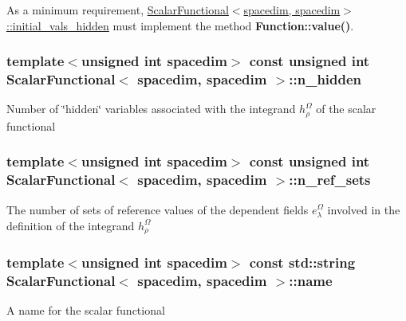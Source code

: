 As a minimum requirement, \hyperlink{class_scalar_functional_3_01spacedim_00_01spacedim_01_4_ae3282d5182360e0030e4cc5e02fbe2eb}{Scalar\+Functional$<$spacedim, spacedim$>$\+::initial\+\_\+vals\+\_\+hidden} must implement the method {\bf Function\+::value()}. 
\subsubsection[{\texorpdfstring{n\+\_\+hidden}{n_hidden}}]{\setlength{\rightskip}{0pt plus 5cm}template$<$unsigned int spacedim$>$ const unsigned int {\bf Scalar\+Functional}$<$ spacedim, spacedim $>$\+::n\+\_\+hidden}\hypertarget{class_scalar_functional_3_01spacedim_00_01spacedim_01_4_a7df6711471715f907bc9911449c5c825}{}\label{class_scalar_functional_3_01spacedim_00_01spacedim_01_4_a7df6711471715f907bc9911449c5c825}
Number of \char`\"{}hidden\char`\"{} variables associated with the integrand $h^\Omega_\rho$ of the scalar functional 
\subsubsection[{\texorpdfstring{n\+\_\+ref\+\_\+sets}{n_ref_sets}}]{\setlength{\rightskip}{0pt plus 5cm}template$<$unsigned int spacedim$>$ const unsigned int {\bf Scalar\+Functional}$<$ spacedim, spacedim $>$\+::n\+\_\+ref\+\_\+sets}\hypertarget{class_scalar_functional_3_01spacedim_00_01spacedim_01_4_acee2c3c289e5b2b680996facc2f79e78}{}\label{class_scalar_functional_3_01spacedim_00_01spacedim_01_4_acee2c3c289e5b2b680996facc2f79e78}
The number of sets of reference values of the dependent fields $e^\Omega_\lambda$ involved in the definition of the integrand $h^\Omega_\rho$ 
\subsubsection[{\texorpdfstring{name}{name}}]{\setlength{\rightskip}{0pt plus 5cm}template$<$unsigned int spacedim$>$ const std\+::string {\bf Scalar\+Functional}$<$ spacedim, spacedim $>$\+::name}\hypertarget{class_scalar_functional_3_01spacedim_00_01spacedim_01_4_a195248af3821548af3000872e9e6d00e}{}\label{class_scalar_functional_3_01spacedim_00_01spacedim_01_4_a195248af3821548af3000872e9e6d00e}
A name for the scalar functional 
